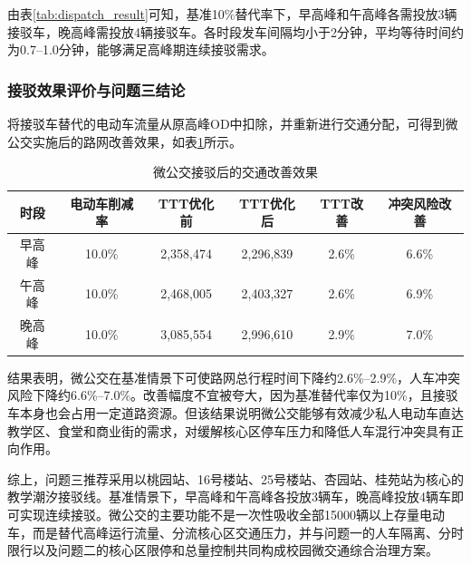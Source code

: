 \documentclass[UTF8,zihao=-4,a4paper]{ctexart}
\begin{document}
由表\ref{tab:dispatch_result}可知，基准10\%替代率下，早高峰和午高峰各需投放3辆接驳车，晚高峰需投放4辆接驳车。各时段发车间隔均小于2分钟，平均等待时间约为0.7--1.0分钟，能够满足高峰期连续接驳需求。

\subsubsection{接驳效果评价与问题三结论}

将接驳车替代的电动车流量从原高峰OD中扣除，并重新进行交通分配，可得到微公交实施后的路网改善效果，如表\ref{tab:effect_result}所示。

\begin{table}[H]
\centering
\caption{微公交接驳后的交通改善效果}
\label{tab:effect_result}
\begin{tabular}{cccccc}
\toprule
\textbf{时段} & \textbf{电动车削减率} & \textbf{TTT优化前} & \textbf{TTT优化后} & \textbf{TTT改善} & \textbf{冲突风险改善} \\
\midrule
早高峰 & 10.0\% & 2,358,474 & 2,296,839 & 2.6\% & 6.6\% \\
午高峰 & 10.0\% & 2,468,005 & 2,403,327 & 2.6\% & 6.9\% \\
晚高峰 & 10.0\% & 3,085,554 & 2,996,610 & 2.9\% & 7.0\% \\
\bottomrule
\end{tabular}
\end{table}

结果表明，微公交在基准情景下可使路网总行程时间下降约2.6\%--2.9\%，人车冲突风险下降约6.6\%--7.0\%。改善幅度不宜被夸大，因为基准替代率仅为10\%，且接驳车本身也会占用一定道路资源。但该结果说明微公交能够有效减少私人电动车直达教学区、食堂和商业街的需求，对缓解核心区停车压力和降低人车混行冲突具有正向作用。

综上，问题三推荐采用以桃园站、16号楼站、25号楼站、杏园站、桂苑站为核心的教学潮汐接驳线。基准情景下，早高峰和午高峰各投放3辆车，晚高峰投放4辆车即可实现连续接驳。微公交的主要功能不是一次性吸收全部15000辆以上存量电动车，而是替代高峰运行流量、分流核心区交通压力，并与问题一的人车隔离、分时限行以及问题二的核心区限停和总量控制共同构成校园微交通综合治理方案。
\end{document}
